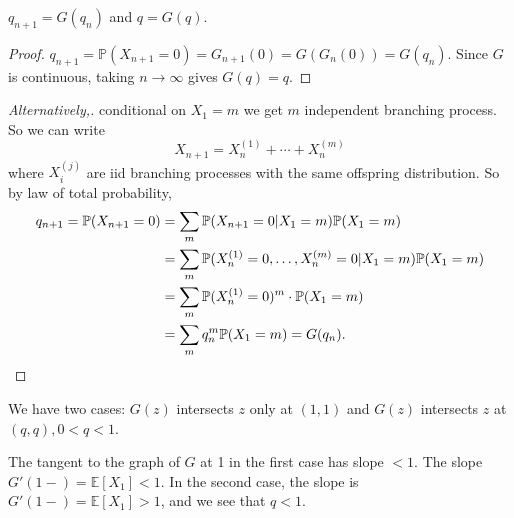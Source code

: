 \begin{claim}
    $ q_{n+1}=G(q_n) $ and $ q=G(q) $.
\end{claim}
\begin{proof}
    $ q_{n+1}=\mathbb{P}(X_{n+1}=0) = G_{n+1}(0) = G(G_{n}(0))=G(q_n) $. Since $G$ is continuous, taking $ n\to \infty $ gives $ G(q)=q $.
\end{proof}
\begin{proof}[Alternatively,]
    conditional on $X_1=m$ we get $m$ independent branching process. So we can write 
    \[
        X_{n+1}=X_n^{(1)}+ \cdots +X_n^{(m)}
    \]
    where $ X_i^{(j)} $ are iid branching processes with the same offspring distribution. So by law of total probability,
    \begin{align*}
        q_{n+1}=\mathbb{P}(X_{n+1}=0)& = \sum_{m} \mathbb{P}(X_{n+1}=0|X_1=m)\mathbb{P}(X_1=m)\\ 
        &= \sum_{m} \mathbb{P}(X_n^{(1)}=0,\dots,X_n^{(m)}=0|X_1=m)\mathbb{P}(X_1=m)\\ 
        &= \sum_m \mathbb{P}(X_n^{(1)}=0)^m \cdot \mathbb{P}(X_1=m)\\ 
        &= \sum_m q_n^m\mathbb{P}(X_1=m) = G(q_n).\qedhere
    \end{align*}
\end{proof}
We have two cases: $G(z)$ intersects $z$ only at $(1,1)$ and $G(z)$ intersects $z$ at $ (q,q), 0<q<1 $.
\begin{center}
\end{center}
The tangent to the graph of $G$ at 1 in the first case has slope $ <1 $. The slope $ G'(1-)=\mathbb{E}[X_1]<1 $. In the second case, the slope is $ G'(1-)=\mathbb{E}[X_1]>1 $, and we see that $q<1$.

